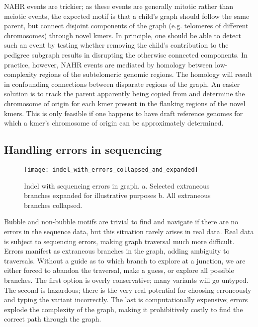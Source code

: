 NAHR events are trickier; as these events are generally mitotic rather than meiotic events, the expected motif is that a child's graph should follow the same parent, but connect disjoint components of the graph (e.g. telomeres of different chromosomes) through novel kmers.  In principle, one should be able to detect such an event by testing whether removing the child's contribution to the pedigree subgraph results in disrupting the otherwise connected components\cite{Hopcroft:1971vx}.  In practice, however, NAHR events are mediated by homology between low-complexity regions of the subtelomeric genomic regions.  The homology will result in confounding connections between disparate regions of the graph.  An easier solution is to track the parent apparently being copied from and determine the chromosome of origin for each kmer present in the flanking regions of the novel kmers.  This is only feasible if one happens to have draft reference genomes for which a kmer's chromosome of origin can be approximately determined.

\subsection{Handling errors in sequencing}

\begin{figure}[h!]
  \centering
    \texttt{[image: indel\_with\_errors\_collapsed\_and\_expanded]}
  \caption{Indel with sequencing errors in graph.  a. Selected extraneous branches expanded for illustrative purposes  b. All extraneous branches collapsed.}
  \label{fig:indel_with_errors_collapsed_and_expanded}
\end{figure}

Bubble and non-bubble motifs are trivial to find and navigate if there are no errors in the sequence data, but this situation rarely arises in real data.  Real data is subject to sequencing errors, making graph traversal much more difficult.  Errors manifest as extraneous branches in the graph, adding ambiguity to traversals.  Without a guide as to which branch to explore at a junction, we are either forced to abandon the traversal, make a guess, or explore all possible branches.  The first option is overly conservative; many variants will go untyped.  The second is hazardous; there is the very real potential for choosing erroneously and typing the variant incorrectly.  The last is computationally expensive; errors explode the complexity of the graph, making it prohibitively costly to find the correct path through the graph.


